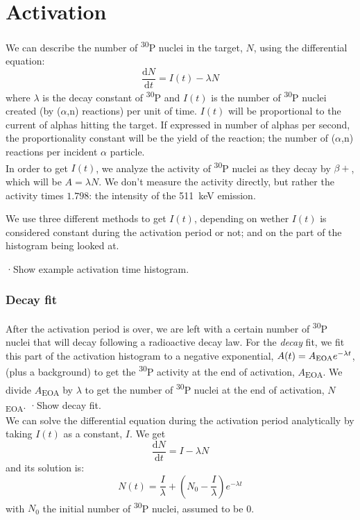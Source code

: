 \documentclass[a4paper,12pt]{report}
\newcommand{\dif}{\text{d}}
\newcommand{\ddt}[1]{\frac{\dif #1}{\dif t}}
\newcommand{\an}{($\alpha$,n) }
\newcommand{\Piso}{\textsuperscript{30}P }
\begin{document}
\section{Activation}
We can describe the number of \Piso nuclei in the target, $N$, using the differential equation:
\begin{equation}
	\ddt{N} = I(t) -\lambda N
\end{equation}
where $\lambda$ is the decay constant of \Piso and $I(t)$ is the number of \Piso nuclei created (by \an reactions) per unit of time.
$I(t)$ will be proportional to the current of alphas hitting the target.
If expressed in number of alphas per second, the proportionality constant will be the yield of the reaction; the number of \an reactions per incident $\alpha$ particle.\\

In order to get $I(t)$, we analyze the activity of \Piso nuclei as they decay by $\beta +$, which will be $A = \lambda N$.
We don't measure the activity directly, but rather the activity times $1.798$: the intensity of the \qty{511}{\keV} emission.	%

We use three different methods to get $I(t)$, depending on wether $I(t)$ is considered constant during the activation period or not; and on the part of the histogram being looked at.

·Show example activation time histogram.\\

\subsubsection{Decay fit}
After the activation period is over, we are left with a certain number of \Piso nuclei that will decay following a radioactive decay law.
For the \textit{decay} fit, we fit this part of the activation histogram to a negative exponential, $A(t) = A\textsubscript{EOA} e^{-\lambda t}$, (plus a background) to get the \Piso activity at the end of activation, $A$\textsubscript{EOA}.
We divide $A$\textsubscript{EOA} by $\lambda$ to get the number of \Piso nuclei at the end of activation, $N$\textsubscript{EOA}.
·Show decay fit.\\

We can solve the differential equation during the activation period analytically by taking $I(t)$ as a constant, $I$.
We get
\[ \ddt{N} = I -\lambda N  \]
and its solution is:
\begin{equation}
	N(t) = \frac{I}{\lambda} + \left(  N_0 - \frac{I}{\lambda}  \right) e^{-\lambda t}
\end{equation}
with $N_0$ the initial number of \Piso nuclei, assumed to be \num{0}.
\end{document}

